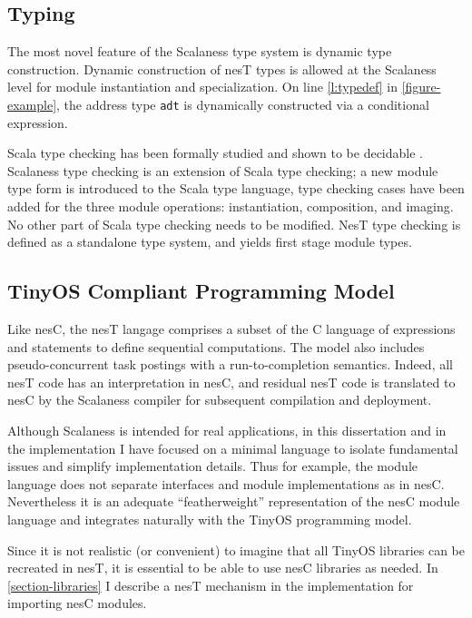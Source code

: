 \subsection{Typing} 

The most novel feature of the Scalaness type system is dynamic type construction. Dynamic
construction of nesT types is allowed at the Scalaness level for module instantiation and
specialization. On line \ref{l:typedef} in \autoref{figure-example}, the address type
\texttt{adt} is dynamically constructed via a conditional expression.

Scala type checking has been formally studied and shown to be decidable
\cite{Cremet:2006:CCS:2135978.2135980}. Scalaness type checking is an extension of Scala type
checking; a new module type form is introduced to the Scala type language, type checking cases
have been added for the three module operations: instantiation, composition, and imaging. No
other part of Scala type checking needs to be modified. NesT type checking is defined as a
standalone type system, and yields first stage module types.

\subsection{TinyOS Compliant Programming Model}

Like nesC, the nesT langage comprises a subset of the C language of expressions and statements
to define sequential computations. The model also includes pseudo-concurrent task postings with
a run-to-completion semantics. Indeed, all nesT code has an interpretation in nesC, and residual
nesT code is translated to nesC by the Scalaness compiler for subsequent compilation and
deployment.

Although Scalaness is intended for real applications, in this dissertation and in the
implementation I have focused on a minimal language to isolate fundamental issues and simplify
implementation details. Thus for example, the module language does not separate interfaces and
module implementations as in nesC. Nevertheless it is an adequate ``featherweight''
representation of the nesC module language and integrates naturally with the TinyOS programming
model.

Since it is not realistic (or convenient) to imagine that all TinyOS libraries can be recreated
in nesT, it is essential to be able to use nesC libraries as needed. In
\autoref{section-libraries} I describe a nesT mechanism in the implementation for importing nesC
modules.

